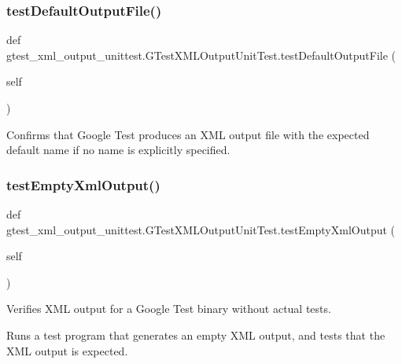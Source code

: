 \subsubsection{\texorpdfstring{testDefaultOutputFile()}{testDefaultOutputFile()}}
{\footnotesize\ttfamily def gtest\+\_\+xml\+\_\+output\+\_\+unittest.\+G\+Test\+X\+M\+L\+Output\+Unit\+Test.\+test\+Default\+Output\+File (\begin{DoxyParamCaption}\item[{}]{self }\end{DoxyParamCaption})}

\begin{DoxyVerb}Confirms that Google Test produces an XML output file with the expected
default name if no name is explicitly specified.
\end{DoxyVerb}
 \mbox{\label{classgtest__xml__output__unittest_1_1_g_test_x_m_l_output_unit_test_a9602f91fe2e9d1e09171a032e94a5619}} 
\subsubsection{\texorpdfstring{testEmptyXmlOutput()}{testEmptyXmlOutput()}}
{\footnotesize\ttfamily def gtest\+\_\+xml\+\_\+output\+\_\+unittest.\+G\+Test\+X\+M\+L\+Output\+Unit\+Test.\+test\+Empty\+Xml\+Output (\begin{DoxyParamCaption}\item[{}]{self }\end{DoxyParamCaption})}

\begin{DoxyVerb}Verifies XML output for a Google Test binary without actual tests.

Runs a test program that generates an empty XML output, and
tests that the XML output is expected.
\end{DoxyVerb}
 \mbox{\label{classgtest__xml__output__unittest_1_1_g_test_x_m_l_output_unit_test_a572b6d49e8f4d646ebdadcced3d260ef}} 
